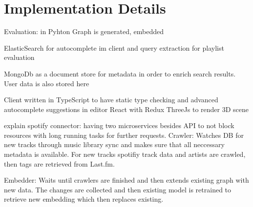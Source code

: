 \documentclass[sigconf]{acmart}
\begin{document}
\newpage
\appendix
\section{Implementation Details}


Evaluation:
in Pyhton
Graph is generated, embedded 


ElasticSearch for autocomplete im client and query extraction for playlist evaluation

MongoDb as a document store for metadata in order to enrich search results. User data is also stored here


Client
written in TypeScript to have static type checking and advanced autocomplete suggestions in editor
React with Redux 
ThreeJs to render 3D scene


explain spotify connector:
having two microservices besides API to not block resources with long running tasks for further requests. 
Crawler: Watches DB for new tracks through music library sync and makes sure that all neccessary metadata is available. For new tracks spotifiy track data and artists are crawled, then tags are retrieved from Last.fm.

Embedder: Waits until crawlers are finished and then extends existing graph with new data. The changes are collected and then existing model is retrained to retrieve new embedding which then replaces existing.
\end{document}
